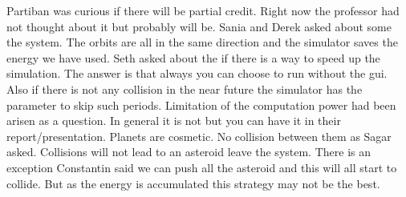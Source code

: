Partiban was curious if there will be partial credit. Right now the professor had not thought about it but probably will be.
Sania and Derek asked about some the system. The orbits are all in the same direction and the simulator saves the energy we have used.
Seth asked about the if there is a way to speed up the simulation. The answer is that always you can choose to run without the gui. Also if there is not any collision in the near future the simulator has the parameter to skip such periods.
Limitation of the computation power had been arisen as a question. In general it is not but you can have it in their report/presentation.
Planets are cosmetic. No collision between them as Sagar asked.
Collisions will not lead to an asteroid leave the system. There is an exception 
Constantin said we can push all the asteroid and this will all start to collide. But as the energy is accumulated this strategy may not be the best.

